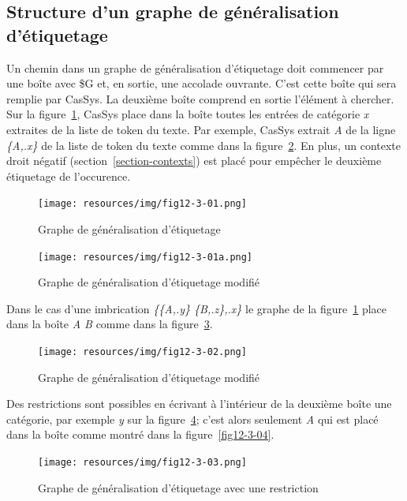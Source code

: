 \subsection{Structure d'un graphe de g\'{e}n\'{e}ralisation d'\'{e}tiquetage}
Un chemin dans un graphe de g\'{e}n\'{e}ralisation d'\'{e}tiquetage doit commencer par une bo\^{i}te avec \$G et, en sortie, une accolade ouvrante. C'est cette bo\^{i}te qui sera remplie par CasSys. La deuxi\`{e}me bo\^{i}te comprend en sortie l'\'{e}l\'{e}ment \`{a} chercher. Sur la figure~\ref{fig12-3-01}, CasSys place dans la bo\^{i}te toutes les entr\'{e}es de cat\'{e}gorie \textit{x} extraites de la liste de token du texte. Par exemple, CasSys extrait \textit{A} de la ligne \emph{\{A,.x\}} de la liste de token du texte comme dans la figure~\ref{fig12-3-01a}. En plus, un contexte droit n\'{e}gatif (section~\ref{section-contexts}) est plac\'{e} pour emp\^{e}cher le  deuxi\`{e}me \'{e}tiquetage de l'occurence.
\begin{figure}[!htb]
  \centering
  \texttt{[image: resources/img/fig12-3-01.png]}
  \caption{Graphe de g\'{e}n\'{e}ralisation d'\'{e}tiquetage}
  \label{fig12-3-01}
\end{figure}
\begin{figure}[!htb]
  \centering
  \texttt{[image: resources/img/fig12-3-01a.png]}
  \caption{Graphe de g\'{e}n\'{e}ralisation d'\'{e}tiquetage modifi\'{e}}
  \label{fig12-3-01a}
\end{figure}


Dans le cas d'une imbrication \emph{\{\{A,.y\} \{B,.z\},.x\}} le graphe de la figure~\ref{fig12-3-01} place dans la bo\^{i}te \textit{A B} comme dans la figure~\ref{fig12-3-02}.
\begin{figure}[!htb]
  \centering
  \texttt{[image: resources/img/fig12-3-02.png]}
  \caption{Graphe de g\'{e}n\'{e}ralisation d'\'{e}tiquetage modifi\'{e}}
  \label{fig12-3-02}
\end{figure}

\noindent Des restrictions sont possibles en \'{e}crivant \`{a} l'int\'{e}rieur de la deuxi\`{e}me bo\^{i}te une cat\'{e}gorie, par exemple \textit{y} sur la figure~\ref{fig12-3-03}; c'est alors seulement \textit{A} qui est placé dans la bo\^{i}te comme montr\'{e} dans la figure~\ref{fig12-3-04}.
\begin{figure}[!htb]
  \centering
  \texttt{[image: resources/img/fig12-3-03.png]}
  \caption{Graphe de g\'{e}n\'{e}ralisation d'\'{e}tiquetage avec une restriction}
  \label{fig12-3-03}
\end{figure}

